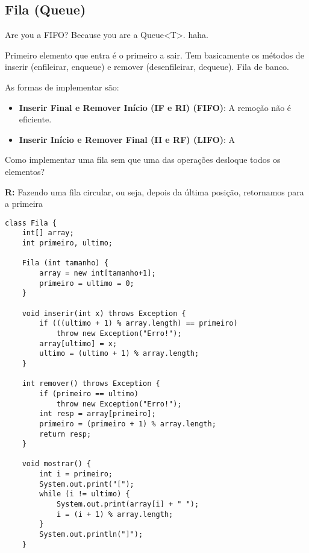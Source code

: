 \documentclass{article}
\begin{document}
\subsection{Fila (Queue)}
Are you a FIFO? Because you are a Queue\textless T\textgreater. haha.

Primeiro elemento que entra é o primeiro a sair. Tem basicamente os métodos de inserir (enfileirar, enqueue) e remover (desenfileirar, dequeue). Fila de banco.

As formas de implementar são: 
\begin{itemize}
    \item \textbf{Inserir Final e Remover Início (IF e RI) (FIFO)}: A remoção não é eficiente.
    \item \textbf{Inserir Início e Remover Final (II e RF) (LIFO)}: A 
\end{itemize}
Como implementar uma fila sem que uma das operações
desloque todos os elementos?

\textbf{R:} Fazendo uma fila circular, ou seja, depois da última posição,
retornamos para a primeira
\begin{verbatim}
class Fila {
    int[] array;
    int primeiro, ultimo;

    Fila (int tamanho) {
        array = new int[tamanho+1];
        primeiro = ultimo = 0;
    }

    void inserir(int x) throws Exception {
        if (((ultimo + 1) % array.length) == primeiro)
            throw new Exception("Erro!");
        array[ultimo] = x;
        ultimo = (ultimo + 1) % array.length;
    }

    int remover() throws Exception {
        if (primeiro == ultimo)
            throw new Exception("Erro!");
        int resp = array[primeiro];
        primeiro = (primeiro + 1) % array.length;
        return resp;
    }

    void mostrar() {
        int i = primeiro;
        System.out.print("[");
        while (i != ultimo) {
            System.out.print(array[i] + " ");
            i = (i + 1) % array.length;
        }
        System.out.println("]");
    }
\end{verbatim}
\end{document}
